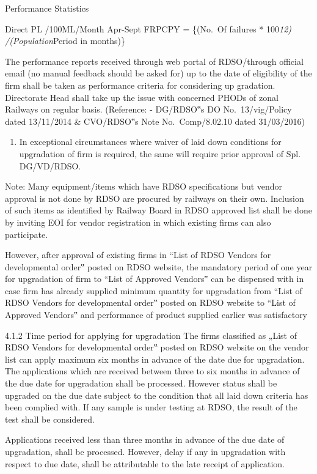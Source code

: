\documentclass[
  ignorenonframetext,
]{beamer}
\providecommand{\tightlist}{%
  \setlength{\itemsep}{0pt}\setlength{\parskip}{0pt}}
\begin{document}
\begin{frame}{Performance Statistics}
\begin{block}{Direct PL /100ML/Month Apr-Sept}
FRPCPY = \{(No.~Of failures * 100\emph{12) /(Population}Period in
months)\}

The performance reports received through web portal of RDSO/through
official email (no manual feedback should be asked for) up to the date
of eligibility of the firm shall be taken as performance criteria for
considering up gradation.\\
Directorate Head shall take up the issue with concerned PHODs of zonal
Railways on regular basis. (Reference: - DG/RDSO‟s DO No.~13/vig/Policy
dated 13/11/2014 \& CVO/RDSO‟s Note No.~Comp/8.02.10 dated 31/03/2016)

\begin{enumerate}[<+->]
[a)]
\setcounter{enumi}{6}
\tightlist
\item
  In exceptional circumstances where waiver of laid down conditions for
  upgradation of firm is required, the same will require prior approval
  of Spl. DG/VD/RDSO.
\end{enumerate}

Note: Many equipment/items which have RDSO specifications but vendor
approval is not done by RDSO are procured by railways on their own.
Inclusion of such items as identified by Railway Board in RDSO approved
list shall be done by inviting EOI for vendor registration in which
existing firms can also participate.

However, after approval of existing firms in ``List of RDSO Vendors for
developmental order‟ posted on RDSO website, the mandatory period of one
year for upgradation of firm to ``List of Approved Vendors‟ can be
dispensed with in case firm has already supplied minimum quantity for
upgradation from ``List of RDSO Vendors for developmental order‟ posted
on RDSO website to ``List of Approved Vendors‟ and performance of
product supplied earlier was satisfactory

4.1.2 Time period for applying for upgradation The firms classified as
„List of RDSO Vendors for developmental order‟ posted on RDSO website on
the vendor list can apply maximum six months in advance of the date due
for upgradation. The applications which are received between three to
six months in advance of the due date for upgradation shall be
processed. However status shall be upgraded on the due date subject to
the condition that all laid down criteria has been complied with. If any
sample is under testing at RDSO, the result of the test shall be
considered.

Applications received less than three months in advance of the due date
of upgradation, shall be processed. However, delay if any in upgradation
with respect to due date, shall be attributable to the late receipt of
application.


\end{block}
\end{frame}
\end{document}
